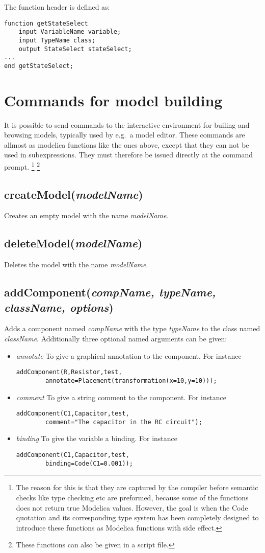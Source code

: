 \documentclass{report}
\newcommand{\func}[1]{\section{#1}}
\newcommand{\funcbegin}{}
\newcommand{\funcend}{}
\begin{document}
The function header is defined as:
\begin{verbatim}
function getStateSelect
    input VariableName variable;
    input TypeName class;
    output StateSelect stateSelect;
...
end getStateSelect;
\end{verbatim}

\funcend

\chapter{Commands for model building}
It is possible to send commands to the interactive environment for
builing and browsing models, typically used by e.g.\ a model
editor. These commands are allmost as modelica functions like the ones
above, except that they can not be used in subexpressions. They must
therefore be issued directly at the command prompt. \footnote{The reason for
this is that they are captured by the compiler before semantic checks
like type checking etc are preformed, because some of the functions
does not return true Modelica values. However, the goal is when the
Code quotation and its corresponding type system has been completely
designed to introduce these functions as Modelica functions with side
effect.} 
\footnote{These functions can also be given in a script file.}

\funcbegin

\func{createModel(\emph{modelName})}
Creates an empty model with the name \emph{modelName}.

\func{deleteModel(\emph{modelName})}
Deletes the model with the name \emph{modelName}.

\func{addComponent(\emph{compName, typeName, className, options})}
Adds a component named \emph{compName} with the type \emph{typeName}
to the class named \emph{className}. Additionally three optional named
arguments can be given:
\begin{itemize}
\item{\emph{annotate}} To give a graphical annotation to the
component. For instance
\begin{verbatim}
addComponent(R,Resistor,test, 
        annotate=Placement(transformation(x=10,y=10)));
\end{verbatim}
\item{\emph{comment}} To give a string comment to the component.
For instance
\begin{verbatim}
addComponent(C1,Capacitor,test,
        comment="The capacitor in the RC circuit");
\end{verbatim}
\item{\emph{binding}} To give the variable a binding.
For instance
\begin{verbatim}
addComponent(C1,Capacitor,test,
        binding=Code(C1=0.001));
\end{verbatim}
\end{itemize}
\end{document}
